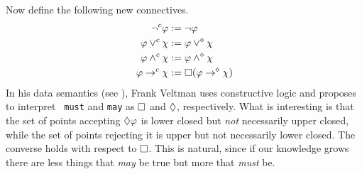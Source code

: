 Now define the following new connectives.
\begin{equation}
\begin{split}
\neg^c \varphi & := \neg \varphi \\
\varphi \vee^c \chi & := \varphi \vee^{\diamond} \chi \\
\varphi \wedge^c \chi & := \varphi \wedge^{\diamond} \chi \\
\varphi \rightarrow^c \chi & := \square (\varphi \rightarrow^{\diamond} \chi)
\end{split}
\end{equation}
In his data semantics (see \cite{veltman:conditionals}), Frank
Veltman 
uses constructive logic and proposes to interpret {\tt
must} and {\tt may} as $\square$ and $\lozenge$, respectively. What is
interesting is that the set of points accepting $\lozenge \varphi$ is
lower closed but {\it not\/} necessarily upper closed, while the
set of points rejecting it is upper but not necessarily lower
closed. The converse holds with respect to $\square$. This is natural,
since if our knowledge grows there are less things that {\it
may\/} be true but more that {\it must\/} be.


